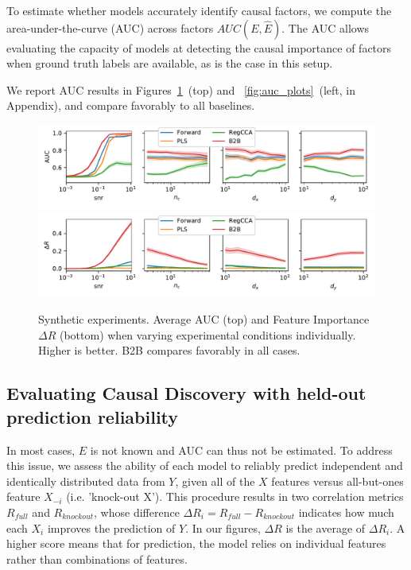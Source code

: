 To estimate whether models accurately identify causal factors, we compute the
area-under-the-curve (AUC) across factors $AUC(E, \hat E)$.
The AUC allows evaluating the capacity of models at detecting the causal
importance of factors when ground truth labels are available, as is the case in
this setup.

We report AUC results in Figures~\ref{fig:percondition}~(top) and ~\ref{fig:auc_plots}~(left, in Appendix), and compare favorably to all baselines.

\begin{figure}[t]
  \centering
  \includegraphics[width=\linewidth]{figures/auc_condition.pdf}
  \includegraphics[width=\linewidth]{figures/r_in_condition.pdf}
  \vspace{-4ex}
  \caption{Synthetic experiments. Average AUC (top) and Feature Importance $\Delta R$ (bottom) when varying experimental conditions individually. Higher is better. B2B compares favorably in all cases. \label{fig:percondition}}
\end{figure}


\subsection{Evaluating Causal Discovery with held-out prediction reliability}

In most cases, $E$ is not known and AUC can thus not be estimated. To address this issue, we assess the ability of each model to reliably predict
independent and identically distributed data from $Y$, given all of the $X$
features versus all-but-ones feature $X_{-i}$ (i.e. 'knock-out X'). This procedure
results in two correlation metrics $R_{full}$ and $R_{knockout}$, whose
difference $\Delta R_i = R_{full}-R_{knockout}$ indicates how much each $X_i$
improves the prediction of $Y$.
In our figures, $\Delta R$ is the average of $\Delta R_i$. A higher score means that for prediction, the model relies on individual features rather than combinations of features.

